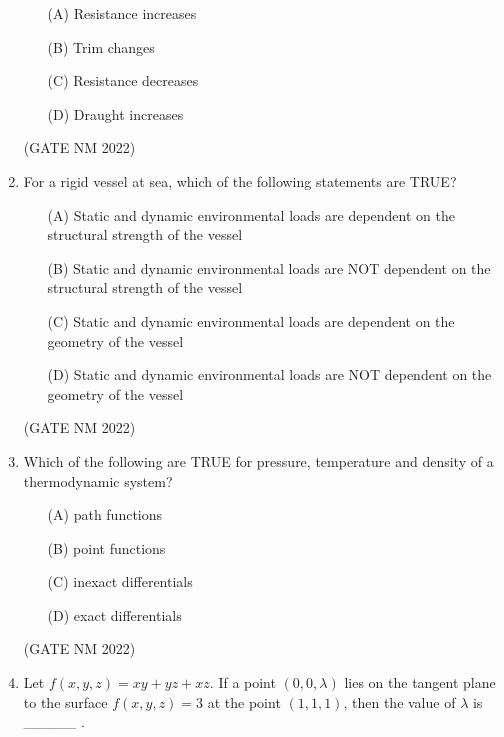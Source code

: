 \documentclass[journal,12pt,onecolumn]{IEEEtran}
\theoremstyle{remark}
\begin{document}
\begin{enumerate}
\begin{enumerate}
    \item[(A)] Resistance increases
    \item[(B)] Trim changes
    \item[(C)] Resistance decreases
    \item[(D)] Draught increases
\end{enumerate}

\hfill(GATE NM 2022)






\item  For a rigid vessel at sea, which of the following statements are TRUE?

\begin{enumerate}
    \item[(A)] Static and dynamic environmental loads are dependent on the structural strength of the vessel
    \item[(B)] Static and dynamic environmental loads are NOT dependent on the structural strength of the vessel
    \item[(C)] Static and dynamic environmental loads are dependent on the geometry of the vessel
    \item[(D)] Static and dynamic environmental loads are NOT dependent on the geometry of the vessel
\end{enumerate}

\hfill(GATE NM 2022)




\item  Which of the following are TRUE for pressure, temperature and density of a thermodynamic system?

\begin{enumerate}
    \item[(A)] path functions
    \item[(B)] point functions
    \item[(C)] inexact differentials
    \item[(D)] exact differentials
\end{enumerate}

\hfill(GATE NM 2022)







\item  Let $ f(x, y, z) = xy + yz + xz . $ If a point $ (0, 0, \lambda) $ lies on the tangent plane to the surface  
$
f(x, y, z) = 3
$
at the point $ (1, 1, 1) $, then the value of $ \lambda $ is \_\_\_\_\_ .


\end{enumerate}
\end{document}
